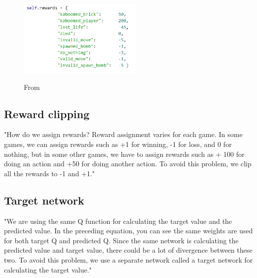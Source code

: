 \documentclass[a4paper ,12pt]{report}
\begin{document}
	\begin{figure}[ht!]
		\caption{From \cite{AlanPresentation}}
		\includegraphics[width=6cm]{rewardsALAN.png}
		\label{fig:rewardsALAN}
	\end{figure}
	
	\subsection*{Reward clipping}
	"How do we assign rewards? Reward assignment varies for each game. In some games, we can assign rewards such as +1 for winning, -1 for loss, and 0 for nothing, but in some other games, we have to assign rewards such as + 100 for doing an action and +50 for doing another action. To avoid this problem, we clip all the rewards to -1 and +1." \cite{UBHD-68505368}
	
	\subsection*{Target network}
	"We are using the same Q function for calculating the target value and the predicted value. In the preceding equation, you can see the same weights  are used for both target Q and predicted Q. Since the same network is calculating the predicted value and target value, there could be a lot of divergence between these two. To avoid this problem, we use a separate network called a target network for calculating the target value." \cite{UBHD-68505368}
	
	
	
\end{document}
